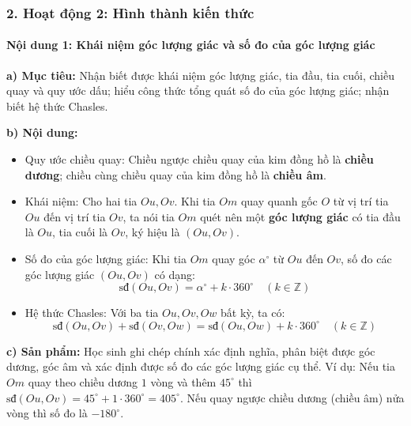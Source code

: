 \documentclass[12pt, a4paper]{article}
\begin{document}
\subsubsection*{2. Hoạt động 2: Hình thành kiến thức}

\paragraph{Nội dung 1: Khái niệm góc lượng giác và số đo của góc lượng giác}
\textbf{a) Mục tiêu:} Nhận biết được khái niệm góc lượng giác, tia đầu, tia cuối, chiều quay và quy ước dấu; hiểu công thức tổng quát số đo của góc lượng giác; nhận biết hệ thức Chasles.

\textbf{b) Nội dung:}
\begin{itemize}[leftmargin=0.6cm]
    \item Quy ước chiều quay: Chiều ngược chiều quay của kim đồng hồ là \textbf{chiều dương}; chiều cùng chiều quay của kim đồng hồ là \textbf{chiều âm}.
    \item Khái niệm: Cho hai tia $Ou, Ov$. Khi tia $Om$ quay quanh gốc $O$ từ vị trí tia $Ou$ đến vị trí tia $Ov$, ta nói tia $Om$ quét nên một \textbf{góc lượng giác} có tia đầu là $Ou$, tia cuối là $Ov$, ký hiệu là $(Ou, Ov)$.
    \item Số đo của góc lượng giác: Khi tia $Om$ quay góc $\alpha^\circ$ từ $Ou$ đến $Ov$, số đo các góc lượng giác $(Ou, Ov)$ có dạng:
    $$\text{sđ}(Ou, Ov) = \alpha^\circ + k \cdot 360^\circ \quad (k \in \mathbb{Z})$$
    \item Hệ thức Chasles: Với ba tia $Ou, Ov, Ow$ bất kỳ, ta có:
    $$\text{sđ}(Ou, Ov) + \text{sđ}(Ov, Ow) = \text{sđ}(Ou, Ow) + k \cdot 360^\circ \quad (k \in \mathbb{Z})$$
\end{itemize}

\textbf{c) Sản phẩm:} Học sinh ghi chép chính xác định nghĩa, phân biệt được góc dương, góc âm và xác định được số đo các góc lượng giác cụ thể. Ví dụ: Nếu tia $Om$ quay theo chiều dương $1$ vòng và thêm $45^\circ$ thì $\text{sđ}(Ou, Ov) = 45^\circ + 1 \cdot 360^\circ = 405^\circ$. Nếu quay ngược chiều dương (chiều âm) nửa vòng thì số đo là $-180^\circ$.
\end{document}
